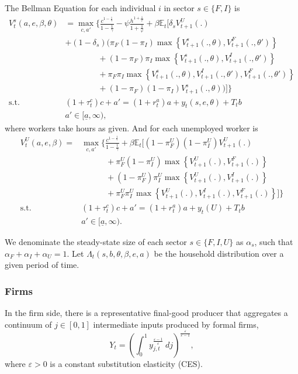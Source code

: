 \documentclass[12pt]{article}
\newcommand{\E}{\mathbb{E}}
\begin{document}
The Bellman Equation for each individual $i$ in sector $s\in\{F,I\}$ is
\begin{align*}
    V_t^s(a,e,\beta,\theta) &= \max_{c,a'} \Bigg\{
    \frac{c^{1-\frac{1}{\gamma}}}{1-\frac{1}{\gamma}}
    - \psi \frac{h^{1+\frac{1}{\varphi}}}{1+\frac{1}{\varphi}}
    + \beta \E_t \!\bigg[ \delta_s V_{t+1}^U(.) \\
    &+ (1-\delta_s) \bigg(
    \pi_F (1-\pi_I) \max\!\left\{V_{t+1}^s(.,\theta), 
            V_{t+1}^F(.,\theta')\right\} \\
    &\qquad\qquad + (1-\pi_F)\pi_I \max\!\left\{V_{t+1}^s(.,\theta), 
            V_{t+1}^I(.,\theta')\right\} \\
    &\qquad\qquad + \pi_F \pi_I \max\!\left\{V_{t+1}^s(.,\theta), 
            V_{t+1}^I(.,\theta'), V_{t+1}^F(.,\theta')\right\} \\
    &\qquad\qquad + (1-\pi_F)(1-\pi_I) V_{t+1}^s(.,\theta)
    \bigg) \bigg] \Bigg\} \\
    \text{s.t.} \qquad &(1+\tau^c_t)c+a'
        = (1+r_t^a) a + y_t(s,e,\theta) + T_t b \\
    &a' \in [\underline a, \infty),
\end{align*}
where workers take hours as given. And for each unemployed worker is
\begin{align*}
    V_t^U(a,e,\beta) = &\max_{c,a'} \Bigg\{
    \frac{c^{1-\frac{1}{\gamma}}}{1-\frac{1}{\gamma}}
    + \beta \E_t \!\bigg[ (1-\pi_F^U)(1-\pi_I^U) V_{t+1}^U(.) \\
    &\quad\qquad + \pi_F^U (1-\pi_I^U) \max\!\left\{V_{t+1}^U(.),
            V_{t+1}^F(.)\right\} \\
    &\quad\qquad + (1-\pi_F^U)\pi_I^U \max\!\left\{V_{t+1}^U(.), 
            V_{t+1}^I(.)\right\} \\
    &\quad\qquad + \pi_F^U \pi_I^U \max\!\left\{V_{t+1}^U(.), 
            V_{t+1}^I(.), V_{t+1}^F(.)\right\}
    \bigg] \Bigg\} \\
    \text{s.t.} \qquad &(1+\tau^c_t)c+a'
        = (1+r_t^a) a + y_t(U) + T_t b \\
    &a' \in [\underline a, \infty).
\end{align*}

We denominate the steady-state size of each sector $s\in\{F,I,U\}$ as $\alpha_s$, such
that $\alpha_F+\alpha_I+\alpha_U=1$. Let $\Lambda_t(s,b,\theta,\beta,e,a)$ be the
household distribution over a given period of time.

\subsubsection*{Firms}
In the firm side, there is a representative final-good producer that aggregates a
continuum of $j\in[0,1]$ intermediate inputs produced by formal firms,
\[
Y_t = \left(
    \int_0^1 y_{j,t}^\frac{\varepsilon-1}{\varepsilon} \: dj 
\right)^\frac{\varepsilon}{\varepsilon-1},
\]
where $\varepsilon>0$ is a constant substitution elasticity (CES).
\end{document}
